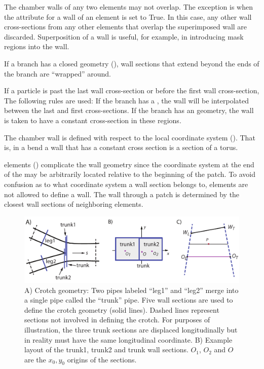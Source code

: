 The chamber walls of any two elements may not overlap. The exception is when the 
attribute for a wall of an element is set to True. In this case, any other wall cross-sections from
any other elements that overlap the superimposed wall are discarded.  Superposition of a wall is
useful, for example, in introducing mask regions into the wall.

If a branch has a closed geometry (), wall sections that extend beyond the ends of the
branch are ``wrapped'' around.

If a particle is past the last wall cross-section or before the first wall cross-section, The
following rules are used: If the branch has a , the wall will be interpolated
between the last and first cross-sections. If the branch has an  geometry, the wall is
taken to have a constant cross-section in these regions.

The chamber wall is defined with respect to the local coordinate system (). That is, in
a bend a wall that has a constant cross section is a section of a torus.

 elements () complicate the wall geometry since the coordinate system at the
end of the  may be arbitrarily located relative to the beginning of the patch. To avoid
confusion as to what coordinate system a wall section belongs to,  elements are not
allowed to define a wall. The wall through a patch is determined by the closest wall sections of
neighboring elements.


\begin{figure}[tb]
  \centering
  \includegraphics[width=6in]{crotch.pdf}
  \caption[vacuum chamber crotch geometry.]
{A) Crotch geometry: Two pipes labeled ``leg1'' and ``leg2'' merge into a single pipe called the
``trunk'' pipe. Five wall sections are used to define the crotch geometry (solid lines). Dashed
lines represent sections not involved in defining the crotch. For purposes of illustration, the
three trunk sections are displaced longitudinally but in reality must have the same longitudinal
coordinate.  B) Example layout of the trunk1, trunk2 and trunk wall sections. $O_1$, $O_2$ and $O$
are the $x_0, y_0$ origins of the sections.}
  \label{f:crotch}
\end{figure}

